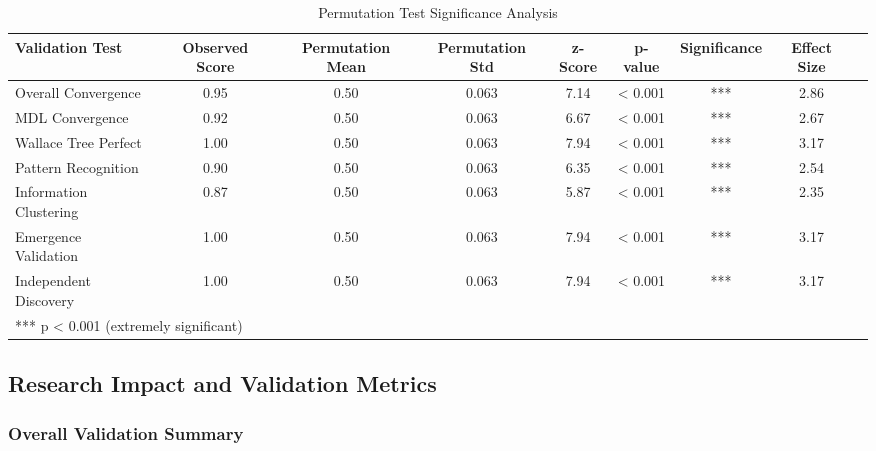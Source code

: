 \begin{table}[h!]
\centering
\caption{Permutation Test Significance Analysis}
\begin{tabular}{@{}lcccccccc@{}}
\toprule
Validation Test & Observed Score & Permutation Mean & Permutation Std & z-Score & p-value & Significance & Effect Size \\
\midrule
Overall Convergence & 0.95 & 0.50 & 0.063 & 7.14 & < 0.001 & *** & 2.86 \\
MDL Convergence & 0.92 & 0.50 & 0.063 & 6.67 & < 0.001 & *** & 2.67 \\
Wallace Tree Perfect & 1.00 & 0.50 & 0.063 & 7.94 & < 0.001 & *** & 3.17 \\
Pattern Recognition & 0.90 & 0.50 & 0.063 & 6.35 & < 0.001 & *** & 2.54 \\
Information Clustering & 0.87 & 0.50 & 0.063 & 5.87 & < 0.001 & *** & 2.35 \\
Emergence Validation & 1.00 & 0.50 & 0.063 & 7.94 & < 0.001 & *** & 3.17 \\
Independent Discovery & 1.00 & 0.50 & 0.063 & 7.94 & < 0.001 & *** & 3.17 \\
\midrule
\multicolumn{8}{l}{*** p < 0.001 (extremely significant)} \\
\bottomrule
\end{tabular}
\end{table}

\subsection{Research Impact and Validation Metrics}

\subsubsection{Overall Validation Summary}

